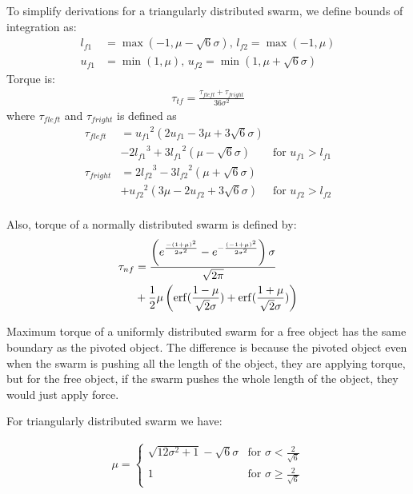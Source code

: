 To simplify derivations for a triangularly distributed swarm, we define bounds of integration as:
\begin{align}
l_{f1} &= \max({-1,\mu-\sqrt{6}\sigma}), \,l_{f2} = \max({-1,\mu})\\ \nonumber
u_{f1} &= \min({1,\mu}), \, u_{f2} = \min({1,\mu+\sqrt{6}\sigma}) \nonumber
\end{align}
Torque is:
\begin{align}
\tau_{tf} = \frac{\tau_{fleft}+ \tau_{fright}}{36\sigma^2}
\end{align}
where $\tau_{fleft}$ and $\tau_{fright}$ is defined as
\begin{align}\nonumber
\tau_{fleft} &=  {u_{f1}}^2(2u_{f1} - 3\mu+3\sqrt{6}\sigma)\\ \nonumber
&-2{l_{f1}}^3+3{l_{f1}}^2(\mu-\sqrt{6}\sigma) &   \textrm{for     } u_{f1} > l_{f1}\\ \nonumber
\tau_{fright} &= 2{l_{f2}}^3-3{l_{f2}}^2(\mu+\sqrt{6}\sigma)\\ \nonumber
&+{u_{f2}}^2( 3\mu-2u_{f2}+3\sqrt{6}\sigma) &   \textrm{for     } u_{f2} > l_{f2}\\ \nonumber
\end{align}

Also, torque of a normally distributed swarm is defined by:
\begin{align} \nonumber
\tau_{nf} &= \frac{\left(e^{\frac{-(1+\mu)^2}{2\sigma^2}}-e^{-\frac{(-1+\mu)^2}{2\sigma^2}}\right)\sigma}{\sqrt{2\pi}}\\
 &+ \frac{1}{2}\mu\left(\operatorname{erf}(\frac{1-\mu}{\sqrt{2}\sigma})+\operatorname{erf}(\frac{1+\mu}{\sqrt{2}\sigma})\right) 
\end{align}

Maximum torque of a uniformly distributed swarm for a free object has the same boundary as the pivoted object. The difference is because the pivoted object even when the swarm is pushing all the length of the object, they are applying torque, but for the free object, if the swarm pushes the whole length of the object, they would just apply force.

For triangularly distributed swarm we have:

\begin{align}
\mu= \left\{
\begin{array}{ll}
 \sqrt{12\sigma^2 +1}  -\sqrt{6}\sigma &   \textrm{for     }  \sigma  <\frac{2}{\sqrt{6}} \\
1 &   \textrm{for     } \sigma \geq \frac{2}{\sqrt{6}} 
\end{array} 
\right.
\end{align}


